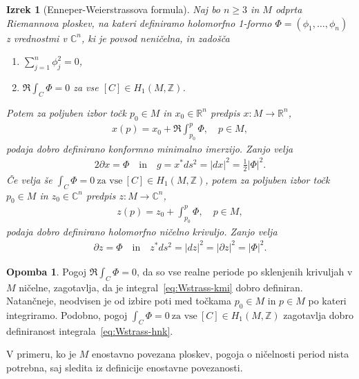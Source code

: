 \documentclass[12pt,a4paper,twoside]{article}
\theoremstyle{definition} %
\newtheorem{opomba}[definicija]{Opomba}
\theoremstyle{plain} %
\newtheorem{izrek}[definicija]{Izrek}
\numberwithin{equation}{section}  %
\newcommand{\R}{\mathbb R}
\newcommand{\Z}{\mathbb Z}
\newcommand{\C}{\mathbb C}
\begin{document}
\begin{izrek}[Enneper-Weierstrassova formula] \label{izr:Enneper-Weierstrass}
Naj bo $n \geq 3$ in $M$ odprta Riemannova ploskev, na kateri definiramo holomorfno 1-formo $\Phi = (\phi_{1}, \dots , \phi_{n})$ z vrednostmi v $\C^{n}$, ki je povsod neničelna, in zadošča 
\begin{enumerate}
\item $ \sum_{j=1}^{n} \phi_{j}^{2} = 0$,
\item $ \Re \int_{C} \Phi = 0 $ za vse $[C] \in H_{1} (M, \Z)$.
\end{enumerate}
Potem za poljuben izbor točk $p_0 \in M$ in $x_0 \in \R^{n}$ predpis $x \colon M \to \R^{n}$,
\begin{align} \label{eq:Wstrass-kmi}
x(p) = x_0 + \Re \int_{p_0}^{p} \Phi, \quad p \in M,
\end{align}
podaja dobro definirano konformno minimalno imerzijo. Zanjo velja
\begin{align}
2 \partial{x} = \Phi \quad \text{in} \quad g = x^{*} ds^2 = |dx|^2 = \frac{1}{2} |\Phi|^2.
\end{align}
%
Če velja še
$ \int_{C} \Phi = 0 \ \text{za vse} \ [C] \in H_{1} (M, \Z) $,
potem za poljuben izbor točk $p_0 \in M$ in $z_0 \in \C^{n}$ predpis $z \colon M \to \C^{n}$,
\begin{align} \label{eq:Wstrass-hnk}
z(p) = z_0 + \int_{p_0}^{p} \Phi, \quad p \in M,
\end{align}
podaja dobro definirano holomorfno ničelno krivuljo. Zanjo velja
\begin{align}
\partial{z} = \Phi \quad \text{in} \quad z^{*} ds^2 = |dz|^2 = |\partial{z}|^2 = |\Phi|^2.
\end{align}
\end{izrek}

\begin{opomba}
Pogoj $ \Re \int_{C} \Phi = 0 $, da so vse realne periode po sklenjenih krivuljah v $M$ ničelne, zagotavlja, da je integral~\eqref{eq:Wstrass-kmi} dobro definiran.
Natančneje, neodvisen je od izbire poti med točkama $p_0 \in M$ in $p \in M$ po kateri integriramo.
Podobno, pogoj $ \int_{C} \Phi = 0 \ \text{za vse} \ [C] \in H_{1} (M, \Z) $ zagotavlja dobro definiranost integrala~\eqref{eq:Wstrass-hnk}. 

V primeru, ko je $M$ enostavno povezana ploskev, pogoja o ničelnosti period nista potrebna, saj sledita iz definicije enostavne povezanosti. 
\end{opomba}
\end{document}
